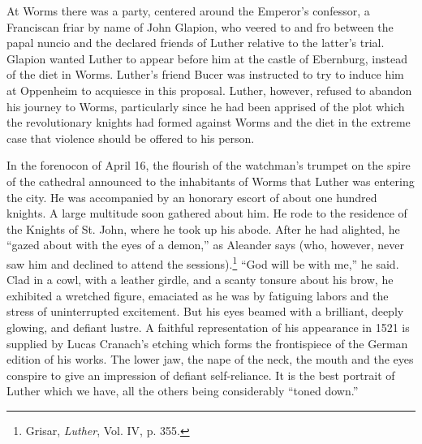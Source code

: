 At Worms there was a party, centered around the Emperor’s confessor,
a Franciscan friar by name of John Glapion, who veered to
and fro between the papal nuncio and the declared friends of
Luther relative to the latter’s trial. Glapion wanted Luther to appear
before him at the castle of Ebernburg, instead of the diet in Worms.
Luther’s friend Bucer was instructed to try to induce him at Oppenheim
to acquiesce in this proposal. Luther, however, refused to
abandon his journey to Worms, particularly since he had been apprised of
the plot which the revolutionary knights had formed
against Worms and the diet in the extreme case that violence should
be offered to his person.

In the forenocon of April 16, the flourish of the watchman’s
trumpet on the spire of the cathedral announced to the inhabitants
of Worms that Luther was entering the city. He was accompanied
by an honorary escort of about one hundred knights. A large multitude soon
gathered about him. He rode to the residence of the
Knights of St. John, where he took up his abode. After he had
alighted, he “gazed about with the eyes of a demon,” as Aleander
says (who, however, never saw him and declined to attend the sessions).\footnote
{Grisar, \textit{Luther}, Vol. IV, p. 355.}
“God will be with me,” he said. Clad in a cowl, with a leather
girdle, and a scanty tonsure about his brow, he exhibited a wretched
figure, emaciated as he was by fatiguing labors and the stress of
uninterrupted excitement. But his eyes beamed with a brilliant, deeply
glowing, and defiant lustre. A faithful representation of his appearance
in 1521 is supplied by Lucas Cranach’s etching which forms
the frontispiece of the German edition of his works. The lower jaw,
the nape of the neck, the mouth and the eyes conspire to give an
impression of defiant self-reliance. It is the best portrait of Luther
which we have, all the others being considerably “toned down.”

